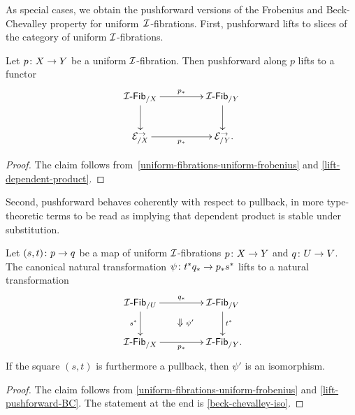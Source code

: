 \documentclass[reqno,10pt,a4paper,oneside,draft]{amsart}
\begin{document}
As special cases, we obtain the pushforward versions of the Frobenius and Beck-Chevalley property for uniform~$\cal{I}$-fibrations.
First, pushforward lifts to slices of the category of uniform $\cal{I}$-fibrations.

\begin{corollary} \label{uniform-fibrations-frobenius-pushforward}
Let $p \co X \to Y$ be a uniform $\cal{I}$-fibration.
Then pushforward along $p$ lifts to a functor
\[
\xymatrix@C+2em{
  \Fib[\cal{I}]_{/X}
  \ar[r]^{p_*}
  \ar[d]
&
  \Fib[\cal{I}]_{/Y}
  \ar[d]
\\
  \catE_{/X}^\to
  \ar[r]_{p_*}
&
  \catE_{/Y}^\to
\rlap{.}}
\]
\end{corollary}

\begin{proof}
The claim follows from~\cref{uniform-fibrations-uniform-frobenius} and \cref{lift-dependent-product}.
\end{proof}

Second, pushforward behaves coherently with respect to pullback, in more type-theoretic terms to be read as implying that dependent product is stable under substitution.

\begin{corollary} \label{uniform-fibrations-BC-pushforward}
Let $(s, t) \co p \to q$ be a map of uniform $\cal{I}$-fibrations $p \co X \to Y$ and $q \co U \to V$.
The canonical natural transformation $\psi \co t^* q_* \to p_* s^*$ lifts to a natural transformation
\[
\xymatrix@C+2em{
  \Fib[\cal{I}]_{/U}
  \ar[r]^{q_*}
  \ar[d]_{s^*}
  \ar@{}[dr]|{\textstyle\Downarrow \rlap{$\labelstyle \psi'$}}
&
  \Fib[\cal{I}]_{/V}
  \ar[d]^{t^*}
\\
  \Fib[\cal{I}]_{/X}
  \ar[r]_{p_*}
&
  \Fib[\cal{I}]_{/Y}
\rlap{.}}
\]
If the square $(s, t)$ is furthermore a pullback, then $\psi'$ is an isomorphism.
\end{corollary}

\begin{proof}
The claim follows from \cref{uniform-fibrations-uniform-frobenius} and \cref{lift-pushforward-BC}.
The statement at the end is \cref{beck-chevalley-iso}.
\end{proof}
\end{document}
